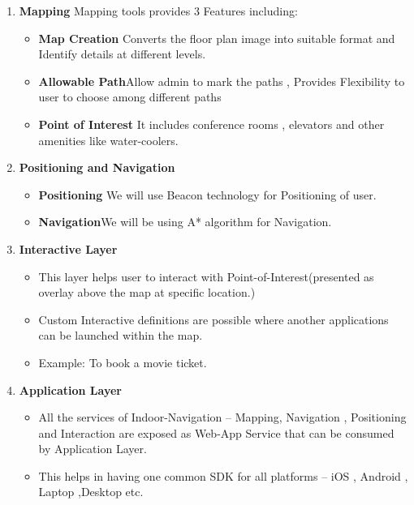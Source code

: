 \documentclass[a4paper, 12pt]{article}
\begin{document}
\begin{enumerate}
 \item \textbf{Mapping}
\linebreak
\linebreak
Mapping tools provides 3 Features including:

\begin{itemize}
	\item \textbf{Map Creation} Converts the floor plan image into suitable format and Identify details at different levels.
	
	\item	\textbf{Allowable Path}Allow admin to mark the paths , Provides Flexibility to user to choose among different paths
	
	\item	\textbf{Point of Interest} It includes conference rooms , elevators and other amenities like water-coolers.
	
\end{itemize}

	\item \textbf{Positioning and Navigation}

	\begin{itemize}
		\item \textbf{Positioning} We will use Beacon technology for Positioning of user.
		
		\item	\textbf{Navigation}We will be using A* algorithm for Navigation.
		
	\end{itemize}

\item \textbf{Interactive Layer}

\begin{itemize}
	\item This layer helps user to interact with Point-of-Interest(presented as overlay above the map at specific location.)
	
	\item	Custom Interactive definitions are possible where another applications can be launched within the map.
	
	\item Example: To book a movie ticket.
	
\end{itemize}

\item \textbf{Application Layer}

\begin{itemize}
	\item All the services of Indoor-Navigation – Mapping, Navigation , Positioning and Interaction are exposed as Web-App Service that can be consumed by Application Layer.
	
	\item	This helps in having one common SDK for all platforms – iOS , Android , Laptop ,Desktop etc.
	
\end{itemize}
\end{enumerate}
\end{document}
